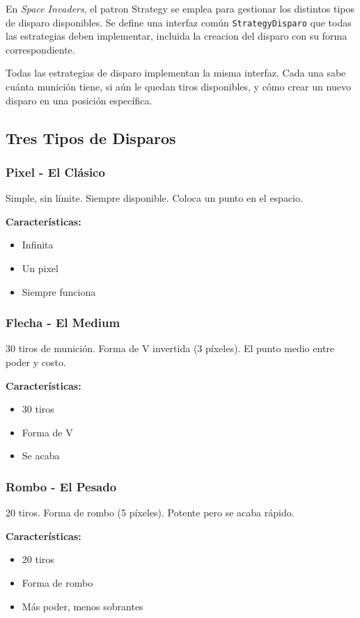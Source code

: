 \documentclass[12pt]{article}
\begin{document}
En \textit{Space Invaders}, el patron Strategy se emplea para gestionar los distintos tipos de disparo disponibles. Se define una interfaz común \texttt{StrategyDisparo} que todas las estrategias deben implementar, incluida la creacion del disparo con su forma correspondiente.

Todas las estrategias de disparo implementan la misma interfaz. Cada una sabe cuánta munición tiene, si aún le quedan tiros disponibles, y cómo crear un nuevo disparo en una posición específica.

\subsection{Tres Tipos de Disparos}

\subsubsection{Pixel - El Clásico}

Simple, sin límite. Siempre disponible. Coloca un punto en el espacio.

\textbf{Características:}
\begin{itemize}
    \item Infinita
    \item Un pixel
    \item Siempre funciona
\end{itemize}

\subsubsection{Flecha - El Medium}

30 tiros de munición. Forma de V invertida (3 píxeles). El punto medio entre poder y costo.

\textbf{Características:}
\begin{itemize}
    \item 30 tiros
    \item Forma de V
    \item Se acaba
\end{itemize}

\subsubsection{Rombo - El Pesado}

20 tiros. Forma de rombo (5 píxeles). Potente pero se acaba rápido.

\textbf{Características:}
\begin{itemize}
    \item 20 tiros
    \item Forma de rombo
    \item Más poder, menos sobrantes
\end{itemize}
\end{document}
